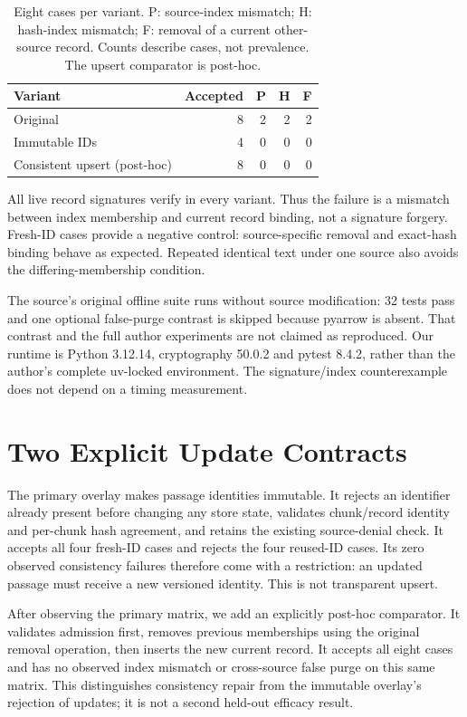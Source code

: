 \documentclass[sigconf,nonacm]{acmart}
\begin{document}
\begin{table}[t]
\caption{Eight cases per variant. P: source-index mismatch; H: hash-index mismatch; F: removal of a current other-source record. Counts describe cases, not prevalence. The upsert comparator is post-hoc.}
\label{tab:matrix}\centering\small
\begin{tabular}{lrrrr}\toprule
Variant & Accepted & P & H & F\\\midrule
Original & 8 & 2 & 2 & 2\\
Immutable IDs & 4 & 0 & 0 & 0\\
Consistent upsert (post-hoc) & 8 & 0 & 0 & 0\\\bottomrule
\end{tabular}
\end{table}

All live record signatures verify in every variant. Thus the failure is a mismatch between index membership and current record binding, not a signature forgery. Fresh-ID cases provide a negative control: source-specific removal and exact-hash binding behave as expected. Repeated identical text under one source also avoids the differing-membership condition.

The source's original offline suite runs without source modification: 32 tests pass and one optional false-purge contrast is skipped because pyarrow is absent. That contrast and the full author experiments are not claimed as reproduced. Our runtime is Python 3.12.14, cryptography 50.0.2 and pytest 8.4.2, rather than the author's complete uv-locked environment. The signature/index counterexample does not depend on a timing measurement.

\section{Two Explicit Update Contracts}
The primary overlay makes passage identities immutable. It rejects an identifier already present before changing any store state, validates chunk/record identity and per-chunk hash agreement, and retains the existing source-denial check. It accepts all four fresh-ID cases and rejects the four reused-ID cases. Its zero observed consistency failures therefore come with a restriction: an updated passage must receive a new versioned identity. This is not transparent upsert.

After observing the primary matrix, we add an explicitly post-hoc comparator. It validates admission first, removes previous memberships using the original removal operation, then inserts the new current record. It accepts all eight cases and has no observed index mismatch or cross-source false purge on this same matrix. This distinguishes consistency repair from the immutable overlay's rejection of updates; it is not a second held-out efficacy result.
\end{document}
